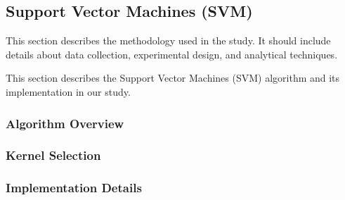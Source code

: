 \subsection{Support Vector Machines (SVM)}
\label{subsec:methods-svm}
This section describes the methodology used in the study. It should include details about data collection, experimental design, and analytical techniques.

This section describes the Support Vector Machines (SVM) algorithm and its implementation in our study.


\subsubsection{Algorithm Overview}

\subsubsection{Kernel Selection}

\subsubsection{Implementation Details}

